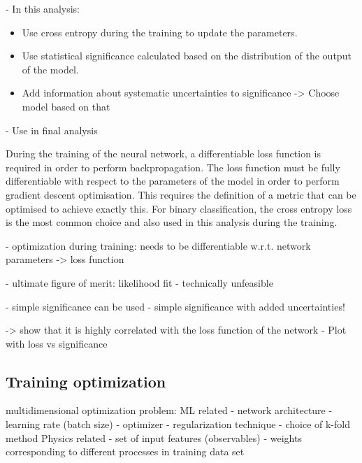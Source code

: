 - In this analysis:

\begin{itemize}
    \item Use cross entropy during the training to update the parameters. 
    \item Use statistical significance calculated based on the distribution of the output of the model. 
    \item Add information about systematic uncertainties to significance -> Choose model based on that
\end{itemize}

- Use in final analysis



During the training of the neural network, a differentiable loss function is required in order to perform backpropagation.
The loss function must be fully differentiable with respect to the parameters of the model in order to perform gradient descent optimisation.
This requires the definition of a metric that can be optimised to achieve exactly this. 
For binary classification, the cross entropy loss is the most common choice and also used in this analysis during the training.



- optimization during training: needs to be differentiable w.r.t. network parameters  -> loss function

- ultimate figure of merit: likelihood fit
- technically unfeasible

- simple significance can be used
- simple significance with added uncertainties!

-> show that it is highly correlated with the loss function of the network
- Plot with loss vs significance

\subsection{Training optimization}

multidimensional optimization problem:
ML related
- network architecture
- learning rate (batch size)
- optimizer
- regularization technique
- choice of k-fold method
Physics related
- set of input features (observables)
- weights corresponding to different processes in training data set




